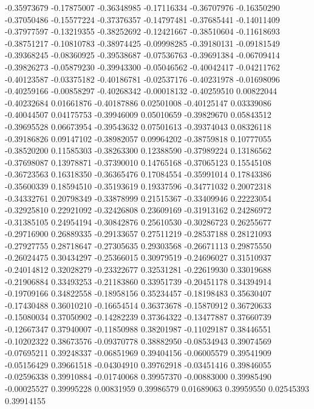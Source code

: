 -0.35973679  -0.17875007 
-0.36348985  -0.17116334 
-0.36707976  -0.16350290 
-0.37050486  -0.15577224 
-0.37376357  -0.14797481 
-0.37685441  -0.14011409 
-0.37977597  -0.13219355 
-0.38252692  -0.12421667 
-0.38510604  -0.11618693 
-0.38751217  -0.10810783 
-0.38974425  -0.09998285 
-0.39180131  -0.09181549 
-0.39368245  -0.08360925 
-0.39538687  -0.07536763 
-0.39691384  -0.06709414 
-0.39826273  -0.05879230 
-0.39943300  -0.05046562 
-0.40042417  -0.04211762 
-0.40123587  -0.03375182 
-0.40186781  -0.02537176 
-0.40231978  -0.01698096 
-0.40259166  -0.00858297 
-0.40268342  -0.00018132 
-0.40259510  0.00822044  
-0.40232684  0.01661876  
-0.40187886  0.02501008  
-0.40125147  0.03339086  
-0.40044507  0.04175753  
-0.39946009  0.05010659  
-0.39829670  0.05843512  
-0.39695528  0.06673954  
-0.39543632  0.07501613  
-0.39374043  0.08326118  
-0.39186826  0.09147102  
-0.38982057  0.09964202  
-0.38759818  0.10777055  
-0.38520200  0.11585303  
-0.38263300  0.12388590  
-0.37989224  0.13186562  
-0.37698087  0.13978871  
-0.37390010  0.14765168  
-0.37065123  0.15545108  
-0.36723563  0.16318350  
-0.36365476  0.17084554  
-0.35991014  0.17843386  
-0.35600339  0.18594510  
-0.35193619  0.19337596  
-0.34771032  0.20072318  
-0.34332761  0.20798349  
-0.33878999  0.21515367  
-0.33409946  0.22223054  
-0.32925810  0.22921092  
-0.32426808  0.23609169  
-0.31913162  0.24286972  
-0.31385105  0.24954194  
-0.30842876  0.25610530  
-0.30286723  0.26255677  
-0.29716900  0.26889335  
-0.29133657  0.27511219  
-0.28537188  0.28121093  
-0.27927755  0.28718647  
-0.27305635  0.29303568  
-0.26671113  0.29875550  
-0.26024475  0.30434297  
-0.25366015  0.30979519  
-0.24696027  0.31510937  
-0.24014812  0.32028279  
-0.23322677  0.32531281  
-0.22619930  0.33019688  
-0.21906884  0.33493253  
-0.21183860  0.33951739  
-0.20451178  0.34394914  
-0.19709166  0.34822558  
-0.18958156  0.35234457  
-0.18198483  0.35630407  
-0.17430488  0.36010210  
-0.16654514  0.36373678  
-0.15870912  0.36720633  
-0.15080034  0.37050902  
-0.14282239  0.37364322  
-0.13477887  0.37660739  
-0.12667347  0.37940007  
-0.11850988  0.38201987  
-0.11029187  0.38446551  
-0.10202322  0.38673576  
-0.09370778  0.38882950  
-0.08534943  0.39074569  
-0.07695211  0.39248337  
-0.06851969  0.39404156  
-0.06005579  0.39541909  
-0.05156429  0.39661518  
-0.04304910  0.39762918  
-0.03451416  0.39846055  
-0.02596338  0.39910884  
-0.01740068  0.39957370  
-0.00883000  0.39985490  
-0.00025527  0.39995228  
0.00831959   0.39986579  
0.01689063   0.39959550  
0.02545393   0.39914155  
